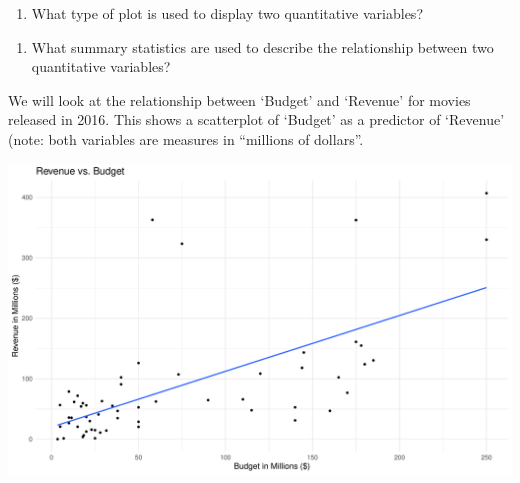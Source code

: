 \documentclass[
]{report}
\newenvironment{Shaded}{\begin{snugshade}}{\end{snugshade}}
\newcommand{\CommentTok}[1]{\textcolor[rgb]{0.56,0.35,0.01}{\textit{#1}}}
\newcommand{\DataTypeTok}[1]{\textcolor[rgb]{0.13,0.29,0.53}{#1}}
\newcommand{\KeywordTok}[1]{\textcolor[rgb]{0.13,0.29,0.53}{\textbf{#1}}}
\newcommand{\NormalTok}[1]{#1}
\newcommand{\OperatorTok}[1]{\textcolor[rgb]{0.81,0.36,0.00}{\textbf{#1}}}
\newcommand{\OtherTok}[1]{\textcolor[rgb]{0.56,0.35,0.01}{#1}}
\newcommand{\StringTok}[1]{\textcolor[rgb]{0.31,0.60,0.02}{#1}}
\providecommand{\tightlist}{%
  \setlength{\itemsep}{0pt}\setlength{\parskip}{0pt}}
\begin{document}
\begin{enumerate}
\def\labelenumi{\arabic{enumi}.}
\tightlist
\item
  What type of plot is used to display two quantitative variables?
\end{enumerate}

\vspace{0.5in}

\begin{enumerate}
\def\labelenumi{\arabic{enumi}.}
\setcounter{enumi}{1}
\tightlist
\item
  What summary statistics are used to describe the relationship between two quantitative variables?
\end{enumerate}

\vspace{0.5in}

We will look at the relationship between `Budget' and `Revenue' for movies released in 2016. This shows a scatterplot of `Budget' as a predictor of `Revenue' (note: both variables are measures in ``millions of dollars''.

\begin{Shaded}
\end{Shaded}

\begin{center}\includegraphics[width=0.7\linewidth]{05-EDA-multivariate_files/figure-latex/unnamed-chunk-2-1} \end{center}
\end{document}
